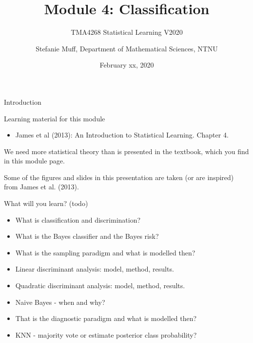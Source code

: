 \documentclass[10pt,ignorenonframetext,]{beamer}
\title{Module 4: Classification}
\subtitle{TMA4268 Statistical Learning V2020}
\author{Stefanie Muff, Department of Mathematical Sciences, NTNU}
\date{February xx, 2020}
\providecommand{\tightlist}{%
  \setlength{\itemsep}{0pt}\setlength{\parskip}{0pt}}
\begin{document}
\frame{\titlepage}

\begin{frame}{Introduction}

\begin{block}{Learning material for this module}

\begin{itemize}
\tightlist
\item
  James et al (2013): An Introduction to Statistical Learning. Chapter
  4.
\end{itemize}

We need more statistical theory than is presented in the textbook, which
you find in this module page.

\vspace{2mm}

Some of the figures and slides in this presentation are taken (or are
inspired) from James et al. (2013).

\end{block}

\end{frame}

\begin{frame}

\begin{block}{What will you learn? (todo)}

\begin{itemize}
\tightlist
\item
  What is classification and discrimination?
\item
  What is the Bayes classifier and the Bayes risk?
\item
  What is the sampling paradigm and what is modelled then?
\item
  Linear discriminant analysis: model, method, results.
\item
  Quadratic discriminant analysis: model, method, results.
\item
  Naive Bayes - when and why?
\item
  That is the diagnostic paradigm and what is modelled then?
\item
  KNN - majority vote or estimate posterior class probability?
\end{itemize}

\end{block}

\end{frame}
\end{document}
